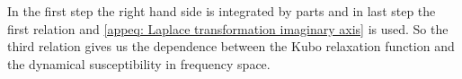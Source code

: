 %
In the first step the right hand side is integrated by parts and in last step the first relation and \eqref{appeq: Laplace transformation imaginary axis} is used.
So the third relation gives us the dependence between the Kubo relaxation function and the dynamical susceptibility in frequency space. 